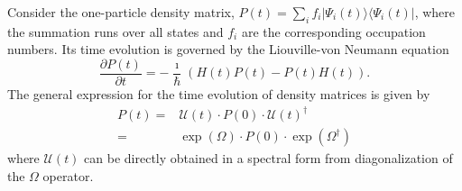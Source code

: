 \documentclass[journal=jctcce,manuscript=article,etalmode=truncate,maxauthors=10,layout=twocolumn,9pt]{achemso}   %
\begin{document}
Consider  the one-particle density matrix,  
$P(t)= \sum_i f_i | \Psi_i(t)\rangle\langle  \Psi_i(t) |$,  
where the summation runs over all states and $f_i$ are the corresponding  occupation numbers.
Its time evolution is governed by  the Liouville-von Neumann equation
\begin{equation}
\frac{\partial P(t)}{ \partial t} = -\frac{\imath}{\hbar} \left( H(t) P(t) - P(t) H(t) \right).
\label{eq:LvN} 
\end{equation}
The general expression for the  time evolution of density matrices %
 is given by
\begin{align}
\label{eq:UxP0xU}
P(t) =& {\mathcal U}(t)\cdot P(0)\cdot {\mathcal U}(t)^\dag \\ \nonumber
     =& \exp(\Omega) \cdot P(0)\cdot  \exp(\Omega^\dag)  
\end{align}
where ${\mathcal U}(t)$  can be directly obtained in a spectral form from  diagonalization of the $\Omega$ operator.
\end{document}
